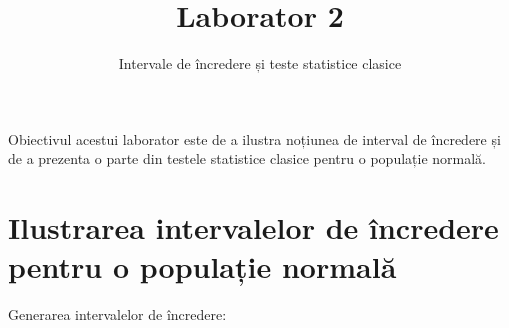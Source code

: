 \documentclass[]{article}
\title{Laborator 2}
\subtitle{Intervale de încredere și teste statistice clasice}
\author{}
\date{}
\begin{document}
\maketitle

\thispagestyle{fancy}

Obiectivul acestui laborator este de a ilustra noțiunea de interval de
încredere și de a prezenta o parte din testele statistice clasice pentru
o populație normală.

\section{Ilustrarea intervalelor de încredere pentru o populație
normală}\label{ilustrarea-intervalelor-de-incredere-pentru-o-populatie-normala}

Generarea intervalelor de încredere:
\end{document}
